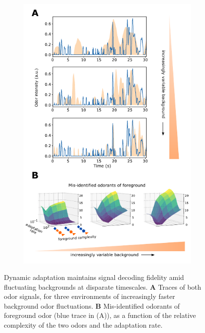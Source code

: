 


\begin{figure}[!tb]
	\begin{subfigure}[t]{\linewidth}
		\includegraphics[width=\textwidth]{figures/Figures_temporal_coding_2}
		\label{fig:temporal_coding_2_a}	
	\end{subfigure}
	\begin{subfigure}[t]{0\linewidth}
		\label{fig:temporal_coding_2_b}
	\end{subfigure}
	\begin{subfigure}[t]{0\linewidth}
		\label{fig:temporal_coding_2_c}
	\end{subfigure}
	\caption{\footnotesize{Dynamic adaptation maintains signal decoding fidelity amid fluctuating backgrounds at disparate timescales. \textbf{A} Traces of both odor signals, for three environments of increasingly faster background odor fluctuations. \textbf{B} Mis-identified odorants of foreground odor (blue trace in (A)), as a function of the relative complexity of the two odors and the adaptation rate.}}
	\label{fig:temporal_coding_2}
\end{figure}


